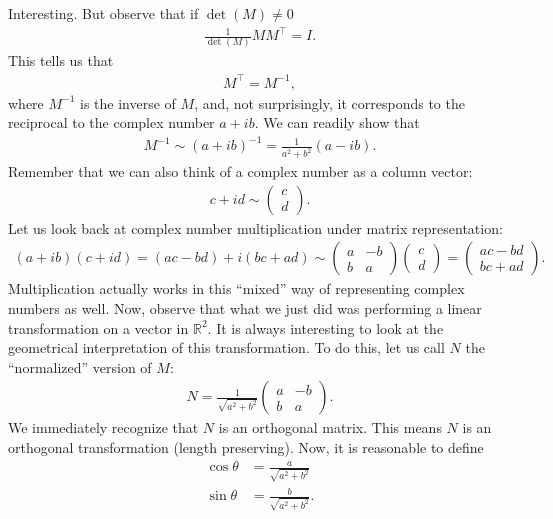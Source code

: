 \documentclass{book}
\theoremstyle{definition}
\newcommand{\R}{\mathbb{R}}
\begin{document}
Interesting. But observe that if $\det(M) \neq 0$
\begin{align*}
\frac{1}{\det(M)}MM^\top = I.
\end{align*}
This tells us that
\begin{align*}
M^\top = M^{-1},
\end{align*}
where $M^{-1}$ is the inverse of $M$, and, not surprisingly, it corresponds to the reciprocal to the complex number $a+ib$. We can readily show that
\begin{align*}
M^{-1} \sim (a+ib)^{-1} = \frac{1}{a^2+b^2}(a-ib).
\end{align*} 
Remember that we can also think of a complex number as a column vector:
\begin{align*}
c + id \sim \begin{pmatrix}
c\\d
\end{pmatrix}.
\end{align*}
Let us look back at complex number multiplication under matrix representation:
\begin{align*}
(a+ib)(c+id) = (ac-bd) + i(bc + ad) \sim \begin{pmatrix}
a & -b\\
b & a
\end{pmatrix}
\begin{pmatrix}
c\\d
\end{pmatrix}=
\begin{pmatrix}
ac-bd\\
bc +ad
\end{pmatrix}.
\end{align*}
Multiplication actually works in this ``mixed'' way of representing complex numbers as well. Now, observe that what we just did was performing a linear transformation on a vector in $\R^2$. It is always interesting to look at the geometrical interpretation of this transformation. To do this, let us call $N$ the ``normalized'' version of $M$:
\begin{align*}
N = \frac{1}{\sqrt{a^2 + b^2}}\begin{pmatrix}
a & -b\\
b & a
\end{pmatrix}.
\end{align*}
We immediately recognize that $N$ is an orthogonal matrix. This means $N$ is an orthogonal transformation (length preserving). Now, it is reasonable to define
\begin{align*}
\cos\theta &= \frac{a}{\sqrt{a^2 + b^2}}\\
\sin\theta &= \frac{b}{\sqrt{a^2+b^2}}.
\end{align*}
\end{document}
